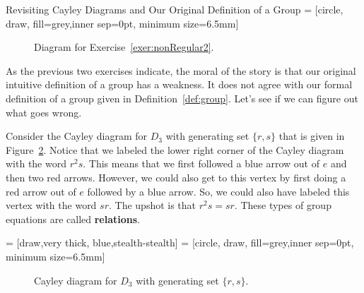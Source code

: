 \begin{section}{Revisiting Cayley Diagrams and Our Original Definition of a Group}
 = [circle, draw, fill=grey,inner sep=0pt, minimum size=6.5mm]

\begin{figure}
\centering
{}
\caption{Diagram for Exercise~\ref{exer:nonRegular2}.}\label{fig:nonRegular2}
\end{figure}

As the previous two exercises indicate, the moral of the story is that our original intuitive definition of a group has a weakness.  It does not agree with our formal definition of a group given in Definition~\ref{def:group}.  Let's see if we can figure out what goes wrong.

Consider the Cayley diagram for $D_3$ with generating set $\{r,s\}$ that is given in Figure~\ref{fig:D3}. Notice that we labeled the lower right corner of the Cayley diagram with the word $r^2s$.  This means that we first followed a blue arrow out of $e$ and then two red arrows.  However, we could also get to this vertex by first doing a red arrow out of $e$ followed by a blue arrow.  So, we could also have labeled this vertex with the word $sr$.  The upshot is that $r^2s=sr$.  These types of group equations are called \textbf{relations}.

 = [draw,very  thick, blue,stealth-stealth]
 = [circle, draw, fill=grey,inner sep=0pt, minimum size=6.5mm]

\begin{figure}
\centering
{}
\caption{Cayley diagram for $D_3$ with generating set $\{r,s\}$.}\label{fig:D3}
\end{figure}


\end{section}
